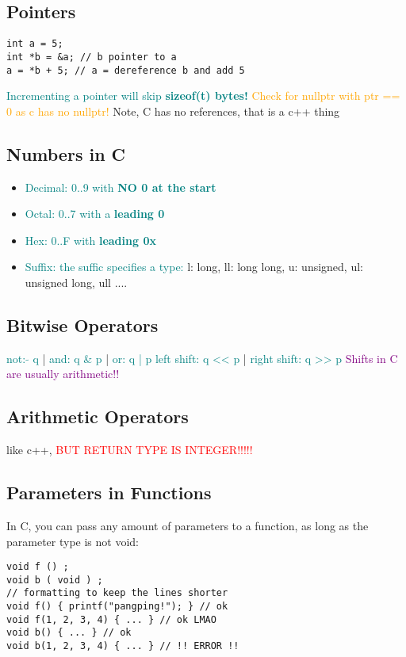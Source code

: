 \documentclass[main.tex,fontsize=7pt,paper=a4,paper=landscape,DIV=calc,]{scrartcl}
\begin{document}
\begin{multicols*}{4}
\subsection{Pointers}
\vspace{-2.5mm}
\begin{lstlisting}
int a = 5;
int *b = &a; // b pointer to a 
a = *b + 5; // a = dereference b and add 5
\end{lstlisting}
\vspace{2mm}
\textcolor{teal}{Incrementing a pointer will skip \textbf{sizeof(t) bytes!}}
\textcolor{orange}{Check for nullptr with ptr == 0 as c has no nullptr!}
Note, C has no references, that is a c++ thing

\subsection{Numbers in C}
\begin{itemize}
\item \textcolor{teal}{Decimal: 0..9 with \textbf{NO 0 at the start}}
\item \textcolor{teal}{Octal: 0..7 with a \textbf{leading 0}}
\item \textcolor{teal}{Hex: 0..F with \textbf{leading 0x}}
\item \textcolor{teal}{Suffix: the suffic specifies a type:}\newline
  l: long, ll: long long, u: unsigned, ul: unsigned long, ull ....
\end{itemize} 

\subsection{Bitwise Operators}
\textcolor{teal}{not: \(\tilde{} \) q} | \textcolor{teal}{and: q \& p} | \textcolor{teal}{or: q | p} \newline
\textcolor{teal}{left shift: q << p} | \textcolor{teal}{right shift: q >> p}\newline
\textcolor{purple}{Shifts in C are usually arithmetic!!}

\subsection{Arithmetic Operators}
like c++, \textcolor{red}{BUT RETURN TYPE IS INTEGER!!!!!}

\subsection{Parameters in Functions}
In C, you can pass any amount of parameters to a function, as long as the parameter type is not void:
\vspace{-2.5mm}
\begin{lstlisting}
void f () ;
void b ( void ) ;
// formatting to keep the lines shorter
void f() { printf("pangping!"); } // ok
void f(1, 2, 3, 4) { ... } // ok LMAO
void b() { ... } // ok
void b(1, 2, 3, 4) { ... } // !! ERROR !!
\end{lstlisting}
\vspace{2mm}


\end{multicols*}
\end{document}
